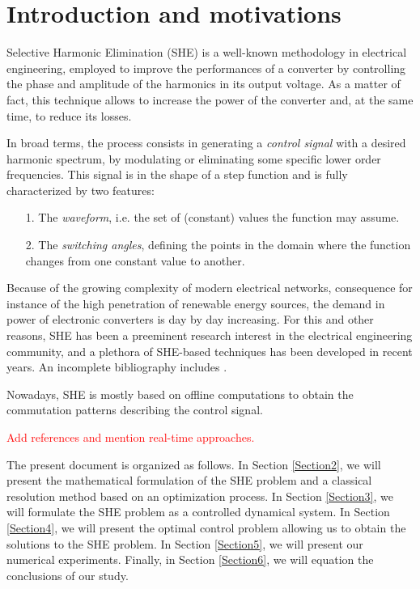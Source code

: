 \section{Introduction and motivations}\label{Section1}

Selective Harmonic Elimination (SHE) \cite{Rodriguez2002} is a well-known methodology in electrical engineering, employed to improve the performances of a converter by controlling the phase and amplitude of the harmonics in its output voltage. As a matter of fact, this technique allows to increase the power of the converter and, at the same time, to reduce its losses. 

In broad terms, the process consists in generating a \textit{control signal} with a desired harmonic spectrum, by modulating or eliminating some specific lower order frequencies. This signal is in the shape of a step function and is fully characterized by two features: 
\begin{itemize}
	\item[1.] The \textit{waveform}, i.e. the set of (constant) values the function may assume.
	\item[2.] The \textit{switching angles}, defining the points in the domain where the function changes from one constant value to another. 
\end{itemize}

Because of the growing complexity of modern electrical networks, consequence for instance of the high penetration of renewable energy sources, the demand in power of electronic converters is day by day increasing. For this and other reasons, SHE has been a preeminent research interest in the electrical engineering community, and a plethora of SHE-based techniques has been developed in recent years. An incomplete bibliography includes \cite{duranay2017selective,Janabi2020,Yang2017}.   

Nowadays, SHE is mostly based on offline computations to obtain the commutation patterns describing the control signal.  

\textcolor{red}{Add references and mention real-time approaches.}


The present document is organized as follows. In Section \ref{Section2}, we will present the mathematical formulation of the SHE problem and a classical resolution method based on an optimization process. In Section \ref{Section3}, we will formulate the SHE problem as a controlled dynamical system. In Section \ref{Section4}, we will present the optimal control problem allowing us to obtain the solutions to the SHE problem. In Section \ref{Section5}, we will present our numerical experiments. Finally, in Section \ref{Section6}, we will equation the conclusions of our study. 
